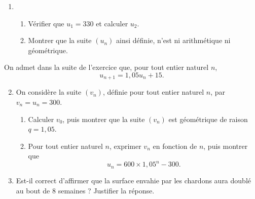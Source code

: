 \documentclass[12pt]{article}
\begin{document}
\begin{enumerate}
  \item \begin{enumerate}
      \item Vérifier que $u_1=330$ et calculer $u_2$.
      \item Montrer que la suite $(u_n)$ ainsi définie, n'est ni arithmétique ni
        géométrique.
    \end{enumerate}
\end{enumerate}
On admet dans la suite de l'exercice que, pour tout entier naturel $n$,
\[
  u_{n+1} = 1,05u_n+15.
\]
\begin{enumerate}
    \setcounter{enumi}{1}
  \item On considère la suite $(v_n)$, définie pour tout entier naturel $n$, par
    $v_n=u_n=300$.
    \begin{enumerate}
      \item Calculer $v_0$, puis montrer que la suite $(v_n)$ est géométrique de
        raison $q=1,05$.
      \item Pour tout entier naturel $n$, exprimer $v_n$ en fonction de $n$,
        puis montrer que
        \[
          u_n = 600\times1,05^n-300.
        \]
    \end{enumerate}
  \item Est-il correct d'affirmer que la surface envahie par les chardons aura
    doublé au bout de $8$ semaines ? Justifier la réponse.
\end{enumerate}
\end{document}
